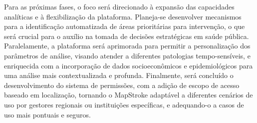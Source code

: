 \documentclass{article}
\begin{document}
Para as próximas fases, o foco será direcionado à expansão das capacidades analíticas e à flexibilização da plataforma. Planeja-se desenvolver mecanismos para a identificação automatizada de áreas prioritárias para intervenção, o que será crucial para o auxílio na tomada de decisões estratégicas em saúde pública. Paralelamente, a plataforma será aprimorada para permitir a personalização dos parâmetros de análise, visando atender a diferentes patologias tempo-sensíveis, e enriquecida com a incorporação de dados socioeconômicos e epidemiológicos para uma análise mais contextualizada e profunda. Finalmente, será concluído o desenvolvimento do sistema de permissões, com a adição de escopo de acesso baseado em localização, tornando o MapStroke adaptável a diferentes cenários de uso por gestores regionais ou instituições específicas, e adequando-o a casos de uso mais pontuais e seguros.
\end{document}
